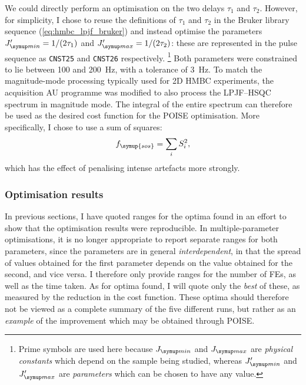 We could directly perform an optimisation on the two delays $\tau_1$ and $\tau_2$.
However, for simplicity, I chose to reuse the definitions of $\tau_1$ and $\tau_2$ in the Bruker library sequence (\cref{eq:hmbc_lpjf_bruker}) and instead optimise the parameters $\Jmin' = 1/(2\tau_1)$ and $\Jmax' = 1/(2\tau_2)$: these are represented in the pulse sequence as \texttt{CNST25} and \texttt{CNST26} respectively.%
\footnote{Prime symbols are used here because $\Jmin$ and $\Jmax$ are \textit{physical constants} which depend on the sample being studied, whereas $\Jmin'$ and $\Jmax'$ are \textit{parameters} which can be chosen to have any value.} 
Both parameters were constrained to lie between 100 and \qty{200}{\Hz}, with a tolerance of \qty{3}{\Hz}.
To match the magnitude-mode processing typically used for 2D HMBC experiments, the acquisition AU programme was modified to also process the LPJF--HSQC spectrum in magnitude mode.
The integral of the entire spectrum can therefore be used as the desired cost function for the POISE optimisation.
More specifically, I chose to use a sum of squares:
\begin{equation}
    \label{eq:sos_cost_function}
    f_{\symup{sos}} = \sum_i S_i^2,
\end{equation}
which has the effect of penalising intense artefacts more strongly.


\subsubsection{Optimisation results}

In previous sections, I have quoted ranges for the optima found in an effort to show that the optimisation results were reproducible.
In multiple-parameter optimisations, it is no longer appropriate to report separate ranges for both parameters, since the parameters are in general \textit{interdependent}, in that the spread of values obtained for the first parameter depends on the value obtained for the second, and vice versa.
I therefore only provide ranges for the number of FEs, as well as the time taken.
As for optima found, I will quote only the \textit{best} of these, as measured by the reduction in the cost function.
These optima should therefore not be viewed as a complete summary of the five different runs, but rather as an \textit{example} of the improvement which may be obtained through POISE.

